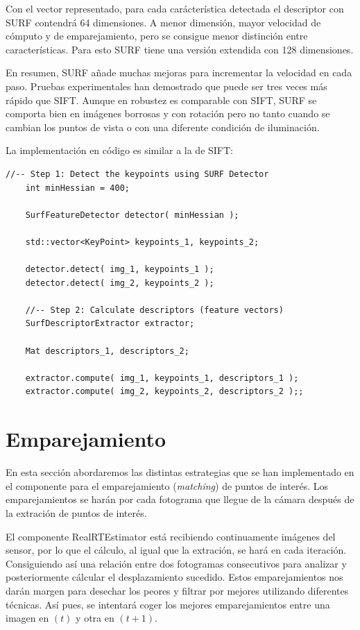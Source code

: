 Con el vector representado, para cada carácterística detectada el descriptor con SURF contendrá 64 dimensiones. A menor dimensión, mayor velocidad de cómputo y de emparejamiento, pero se consigue menor distinción entre características. Para esto SURF tiene una versión extendida con 128 dimensiones.

En resumen, SURF añade muchas mejoras para incrementar la velocidad en cada paso. Pruebas experimentales han demostrado que puede ser tres veces más rápido que SIFT. Aunque en robustez es comparable con SIFT, SURF se comporta bien en imágenes borrosas y con rotación pero no tanto cuando se cambian los puntos de vista o con una diferente condición de iluminación.

La implementación en código es similar a la de SIFT:

\begin{lstlisting}[style=CStyle]
	//-- Step 1: Detect the keypoints using SURF Detector
	int minHessian = 400;

	SurfFeatureDetector detector( minHessian );

	std::vector<KeyPoint> keypoints_1, keypoints_2;

	detector.detect( img_1, keypoints_1 );
	detector.detect( img_2, keypoints_2 );

	//-- Step 2: Calculate descriptors (feature vectors)
	SurfDescriptorExtractor extractor;

	Mat descriptors_1, descriptors_2;

	extractor.compute( img_1, keypoints_1, descriptors_1 );
	extractor.compute( img_2, keypoints_2, descriptors_2 );;
\end{lstlisting}



\section{Emparejamiento}

En esta sección abordaremos las distintas estrategias que se han implementado en el componente para el emparejamiento (\textit{matching}) de puntos de interés. Los emparejamientos se harán por cada fotograma que llegue de la cámara después de la extración de puntos de interés.

El componente RealRTEstimator está recibiendo continuamente imágenes del sensor, por lo que el cálculo, al igual que la extración, se hará en cada iteración. Consiguiendo así una relación entre dos fotogramas consecutivos para analizar y posteriormente cálcular el desplazamiento sucedido. Estos emparejamientos nos darán margen para desechar los peores y filtrar por mejores utilizando diferentes técnicas. Así pues, se intentará coger los mejores emparejamientos entre una imagen en $(t)$ y otra en $(t+1)$.

